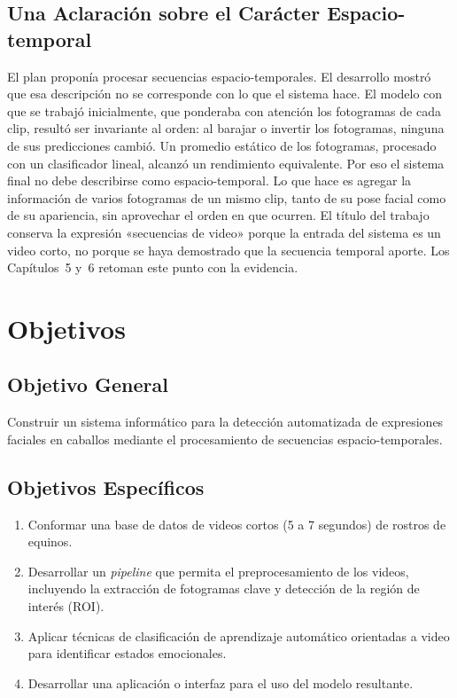 \subsection{Una Aclaración sobre el Carácter Espacio-temporal}
El plan proponía procesar secuencias espacio-temporales. El desarrollo mostró que esa descripción no se corresponde con lo que el sistema hace. El modelo con que se trabajó inicialmente, que ponderaba con atención los fotogramas de cada clip, resultó ser invariante al orden: al barajar o invertir los fotogramas, ninguna de sus predicciones cambió. Un promedio estático de los fotogramas, procesado con un clasificador lineal, alcanzó un rendimiento equivalente. Por eso el sistema final no debe describirse como espacio-temporal. Lo que hace es agregar la información de varios fotogramas de un mismo clip, tanto de su pose facial como de su apariencia, sin aprovechar el orden en que ocurren. El título del trabajo conserva la expresión «secuencias de video» porque la entrada del sistema es un video corto, no porque se haya demostrado que la secuencia temporal aporte. Los Capítulos~5 y~6 retoman este punto con la evidencia.

\section{Objetivos}
\subsection{Objetivo General}
Construir un sistema informático para la detección automatizada de expresiones faciales en caballos mediante el procesamiento de secuencias espacio-temporales.

\subsection{Objetivos Específicos}
\begin{enumerate}
  \item Conformar una base de datos de videos cortos (5 a 7 segundos) de rostros de equinos.
  \item Desarrollar un \textit{pipeline} que permita el preprocesamiento de los videos, incluyendo la extracción de fotogramas clave y detección de la región de interés (ROI).
  \item Aplicar técnicas de clasificación de aprendizaje automático orientadas a video para identificar estados emocionales.
  \item Desarrollar una aplicación o interfaz para el uso del modelo resultante.
\end{enumerate}

